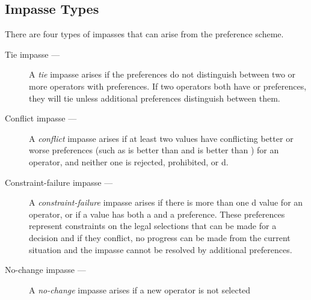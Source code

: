 \subsection{Impasse Types}
\label{ARCH-impasses-types}


There are four types of impasses that can arise from the preference scheme.
\vspace{-12pt}

\begin{description}
\item[Tie impasse ---] 
	A \emph{tie} impasse arises if the preferences do not
        distinguish between two or more operators with 
        preferences. If two operators both have  or 
        preferences, they will tie unless additional preferences distinguish
        between them.\vspace{-8pt}
\item[Conflict impasse ---]
	A \emph{conflict} impasse arises if at least two values have conflicting
        better or worse preferences (such as  is better than 
        and  is better than ) for an operator, and neither
        one is rejected, prohibited, or d.\vspace{-8pt}
\item[Constraint-failure impasse ---]
	A \emph{constraint-failure} impasse arises if there is more than one
        d value for an operator, or if a value has both a
         and a  preference. These preferences
        represent constraints on the legal selections that can be made for a
        decision and if they conflict, no progress can be made from the
        current situation and the impasse cannot be resolved by additional
        preferences.\vspace{-8pt}
\item[No-change impasse ---]
	A \emph{no-change} impasse arises if a new operator is not selected

\end{description}
